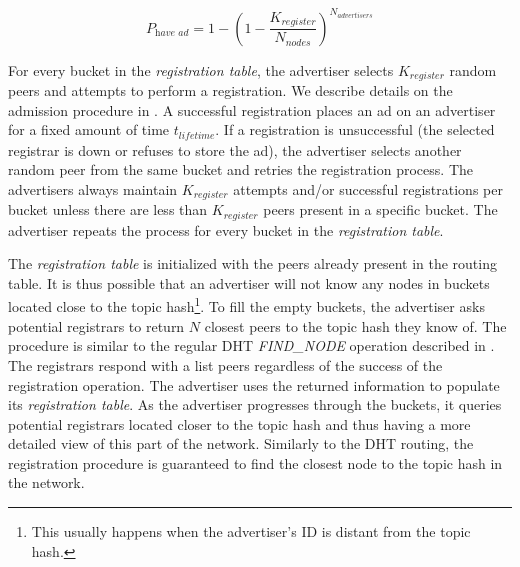 \begin{equation}
    P_\textit{have ad} = 1-(1 - \frac{K_\textit{register}}{N_\textit{nodes}})^{N_\textit{advertisers}}
\end{equation}


For every bucket in the \emph{registration table}, the advertiser selects
$K_{register}$ random peers and attempts to perform a registration.
We describe details on the admission procedure in . 
A successful registration places an ad on an advertiser for a fixed amount of time $t_\textit{lifetime}$.
If a registration is unsuccessful (the selected registrar is down or refuses to store the ad), the advertiser selects another random peer from the same bucket and retries the registration process. 
The advertisers always maintain $K_\textit{register}$ attempts and/or
successful registrations per bucket unless there are less than $K_\textit{register}$ peers present in a specific bucket.
The advertiser repeats the process for every bucket in the \emph{registration table}. 

 




The \emph{registration table} is initialized with the peers already present in the routing table. It is thus possible that an advertiser will not know any nodes in buckets located close to the topic hash\footnote{This usually happens when the advertiser's ID is distant from the topic hash.}. 
To fill the empty buckets, the advertiser asks potential registrars to return $N$ closest peers to the topic hash they know of. 
The procedure is similar to the regular DHT \emph{FIND\_NODE} operation described in . 
The registrars respond with a list peers regardless of the success of the registration operation. 
The advertiser uses the returned information to populate its \emph{registration table}. 
As the advertiser progresses through the buckets, it queries potential registrars located closer to the topic hash and thus having a more detailed view of this part of the network. 
Similarly to the DHT routing, the registration procedure is guaranteed to find the closest node to the topic hash in the network. 





